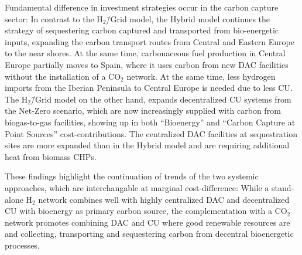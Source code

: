 \documentclass[twocolumn]{article}
\newcommand{\COtwo}{CO$_2$}
\newcommand{\Htwo}{H$_2$}
\newcommand{\modH}{H$_2$\=/Grid model}
\newcommand{\modHybrid}{Hybrid model}
\begin{document}
Fundamental difference in investment strategies occur in the carbon capture sector: In contrast to the \modH{}, the \modHybrid{} continues the strategy of sequestering carbon captured and transported from bio-energetic inputs, expanding the carbon transport routes from Central and Eastern Europe to the near shores. At the same time, carbonaceous fuel production in Central Europe partially moves to Spain, where it uses carbon from new DAC facilities without the installation of a \COtwo{} network. At the same time, less hydrogen imports from the Iberian Peninsula to Central Europe is needed due to less CU.
The \modH{} on the other hand, expands decentralized CU systems from the Net-Zero scenario, which are now increasingly supplied with carbon from biogas-to-gas facilities, showing up in both ``Bioenergy'' and ``Carbon Capture at Point Sources'' cost-contributions. The centralized DAC facilities at sequestration sites are more expanded than in the \modHybrid{} and are requiring additional heat from biomass CHPs.

These findings highlight the continuation of trends of the two systemic approaches, which are interchangable at marginal cost-difference: While a stand-alone \Htwo{} network combines well with highly centralized DAC and decentralized CU with bioenergy as primary carbon source, the complementation with a \COtwo{} network promotes combining DAC and CU where good renewable resources are and collecting, transporting and sequestering carbon from decentral bioenergetic processes.

\end{document}
